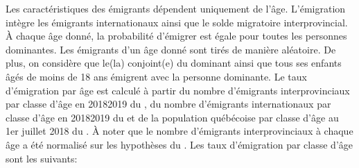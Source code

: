 \documentclass[letterpaper,10pt,french]{sphinxmanual}
\begin{document}
Les caractéristiques des émigrants dépendent uniquement de l’âge. L’émigration intègre les émigrants internationaux ainsi que le solde migratoire interprovincial. À chaque âge donné, la probabilité d’émigrer est égale pour toutes les personnes dominantes. Les émigrants d’un âge donné sont tirés de manière aléatoire. De plus, on considère que le(la) conjoint(e) du dominant ainsi que tous ses enfants âgés de moins de 18 ans émigrent avec la personne dominante. Le taux d’émigration par âge est calculé à partir du nombre d’émigrants interprovinciaux par classe d’âge en 2018\sphinxhyphen{}2019 du , du nombre d’émigrants internationaux par classe d’âge en 2018\sphinxhyphen{}2019 du  et de la population québécoise par classe d’âge au 1er juillet 2018 du . À noter que le nombre d’émigrants interprovinciaux à chaque âge a été normalisé sur les hypothèses du . Les taux d’émigration par classe d’âge sont les suivants:
\end{document}
